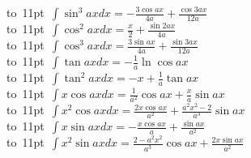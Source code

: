 \begin{footnotesize}
\mbox{\vbox to 11pt{  \hbox{$
\int \sin^3 ax dx = -\frac{3 \cos ax}{4a} + \frac{\cos 3ax} {12a} 
$}  }}
\\
\mbox{\vbox to 11pt{  \hbox{$
\int \cos^2 ax dx = \frac{x}{2}+\frac{ \sin 2ax}{4a} 
$}  }}
\\
\mbox{\vbox to 11pt{  \hbox{$
\int \cos^3 ax dx = \frac{3 \sin ax}{4a}+\frac{ \sin 3ax}{12a} 
$}  }}
\\
\mbox{\vbox to 11pt{  \hbox{$
\int \tan ax dx = -\frac{1}{a} \ln \cos ax 
$}  }}
\\
\mbox{\vbox to 11pt{  \hbox{$
\int \tan^2 ax dx = -x + \frac{1}{a} \tan ax 
$}  }}
\\
\mbox{\vbox to 11pt{  \hbox{$
\int x \cos ax dx = \frac{1}{a^2} \cos ax + \frac{x}{a} \sin ax 
$}  }}
\\
\mbox{\vbox to 11pt{  \hbox{$
\int x^2 \cos ax dx = \frac{2 x \cos ax }{a^2} + \frac{ a^2 x^2 - 2  }{a^3} \sin ax 
$}  }}
\\
\mbox{\vbox to 11pt{  \hbox{$
\int x \sin ax dx = -\frac{x \cos ax}{a} + \frac{\sin ax}{a^2} 
$}  }}
\\
\mbox{\vbox to 11pt{  \hbox{$
\int x^2 \sin ax dx =\frac{2-a^2x^2}{a^3}\cos ax +\frac{ 2 x \sin ax}{a^2} 
$}  }}
\end{footnotesize}
